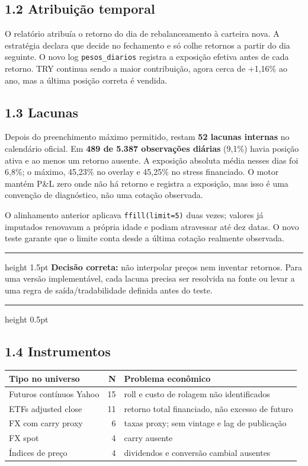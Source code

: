 \documentclass[10pt,a4paper]{article}
\newenvironment{callout}{\begin{center}\begin{minipage}{0.95\linewidth}\color{navy}\hrule height 1.5pt\vspace{2mm}\color{black}}{\vspace{1mm}\color{navy}\hrule height 0.5pt\end{minipage}\end{center}}
\begin{document}
\subsection*{1.2 Atribuição temporal}
O relatório atribuía o retorno do dia de rebalanceamento à carteira nova. A
estratégia declara que decide no fechamento e só colhe retornos a partir do dia
seguinte. O novo log \texttt{pesos\_diarios} registra a exposição efetiva antes
de cada retorno. TRY continua sendo a maior contribuição, agora cerca de
+1,16\% ao ano, mas a última posição correta é vendida.

\subsection*{1.3 Lacunas}
Depois do preenchimento máximo permitido, restam \textbf{52 lacunas internas}
no calendário oficial. Em
\textbf{489 de 5.387 observações diárias} (9,1\%) havia posição ativa e ao menos
um retorno ausente. A exposição absoluta média nesses dias foi 6,8\%; o máximo,
45,23\% no overlay e 45,25\% no stress financiado. O motor mantém P\&L zero onde
não há retorno e registra a exposição, mas isso é uma convenção de diagnóstico,
não uma cotação observada.

O alinhamento anterior aplicava \texttt{ffill(limit=5)} duas vezes; valores já
imputados renovavam a própria idade e podiam atravessar até dez datas. O novo
teste garante que o limite conta desde a última cotação realmente observada.

\begin{callout}
\textbf{Decisão correta:} não interpolar preços nem inventar retornos. Para uma
versão implementável, cada lacuna precisa ser resolvida na fonte ou levar a uma
regra de saída/tradabilidade definida antes do teste.
\end{callout}

\subsection*{1.4 Instrumentos}
\begin{tabularx}{\textwidth}{l r X}
\toprule
Tipo no universo & N & Problema econômico\\
\midrule
Futuros contínuos Yahoo & 15 & roll e custo de rolagem não identificados\\
ETFs adjusted close & 11 & retorno total financiado, não excesso de futuro\\
FX com carry proxy & 6 & taxas proxy; sem vintage e lag de publicação\\
FX spot & 4 & carry ausente\\
Índices de preço & 4 & dividendos e conversão cambial ausentes\\
\bottomrule
\end{tabularx}
\end{document}
